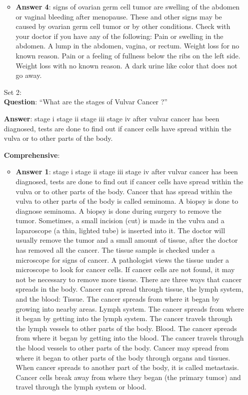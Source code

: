 \begin{enumerate}
\begin{itemize}
						\item \textbf{Answer 4}: signs of ovarian germ cell tumor are swelling of the abdomen or vaginal bleeding after menopause. These and other signs may be caused by ovarian germ cell tumor or by other conditions. Check with your doctor if you have any of the following: Pain or swelling in the abdomen. A lump in the abdomen, vagina, or rectum. Weight loss for no known reason. Pain or a feeling of fullness below the ribs on the left side. Weight loss with no known reason. A dark urine like color that does not go away.
					\end{itemize}	
			\item[Set 2:]\qquad\\
				\textbf{Question}: ``What are the stages of Vulvar Cancer  ?''
				
				\textbf{Answer}: stage i stage ii stage iii stage iv after vulvar cancer has been diagnosed, tests are done to find out if cancer cells have spread within the vulva or to other parts of the body.
				
				\textbf{Comprehensive}: 
				\begin{itemize}
					\item \textbf{Answer 1}: stage i stage ii stage iii stage iv after vulvar cancer has been diagnosed, tests are done to find out if cancer cells have spread within the vulva or to other parts of the body. Cancer that has spread within the vulva to other parts of the body is called seminoma. A biopsy is done to diagnose seminoma. A biopsy is done during surgery to remove the tumor. Sometimes, a small incision (cut) is made in the vulva and a laparoscope (a thin, lighted tube) is inserted into it. The doctor will usually remove the tumor and a small amount of tissue, after the doctor has removed all the cancer. The tissue sample is checked under a microscope for signs of cancer. A pathologist views the tissue under a microscope to look for cancer cells. If cancer cells are not found, it may not be necessary to remove more tissue. There are three ways that cancer spreads in the body. Cancer can spread through tissue, the lymph system, and the blood: Tissue. The cancer spreads from where it began by growing into nearby areas. Lymph system. The cancer spreads from where it began by getting into the lymph system. The cancer travels through the lymph vessels to other parts of the body. Blood. The cancer spreads from where it began by getting into the blood. The cancer travels through the blood vessels to other parts of the body. Cancer may spread from where it began to other parts of the body through organs and tissues. When cancer spreads to another part of the body, it is called metastasis. Cancer cells break away from where they began (the primary tumor) and travel through the lymph system or blood.
					

\end{itemize}
\end{enumerate}
